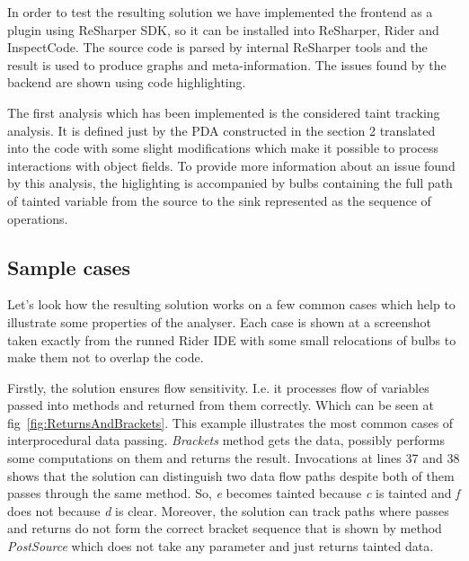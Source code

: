 In order to test the resulting solution we have implemented the frontend as a plugin using ReSharper SDK, so it can be installed into ReSharper, Rider and InspectCode.
The source code is parsed by internal ReSharper tools and the result is used to produce graphs and meta-information.
The issues found by the backend are shown using code highlighting.

The first analysis which has been implemented is the considered taint tracking analysis.
It is defined just by the PDA constructed in the section 2 translated into the code with some slight modifications which make it possible to process interactions with object fields.
To provide more information about an issue found by this analysis, the higlighting is accompanied by bulbs containing the full path of tainted variable from the source to the sink represented as the sequence of operations.

\subsection{Sample cases}

Let's look how the resulting solution works on a few common cases which help to illustrate some properties of the analyser.
Each case is shown at a screenshot taken exactly from the runned Rider IDE with some small relocations of bulbs to make them not to overlap the code.

Firstly, the solution ensures flow sensitivity. I.e. it processes flow of variables passed into methods and returned from them correctly.
Which can be seen at fig~\ref{fig:ReturnsAndBrackets}.
This example illustrates the most common cases of interprocedural data passing.
\textit{Brackets} method gets the data, possibly performs some computations on them and returns the result.
Invocations at lines 37 and 38 shows that the solution can distinguish two data flow paths despite both of them passes through the same method.
So, \textit{e} becomes tainted because \textit{c} is tainted and \textit{f} does not because \textit{d} is clear.
Moreover, the solution can track paths where passes and returns do not form the correct bracket sequence that is shown by method \textit{PostSource} which does not take any parameter and just returns tainted data.

